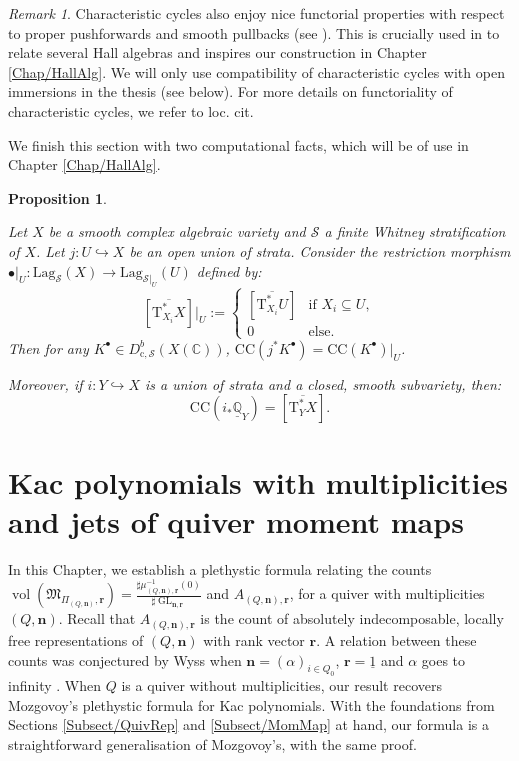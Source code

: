 \documentclass[11pt,english]{article}
\numberwithin{equation}{section}
\numberwithin{figure}{section}
\theoremstyle{definition}
\theoremstyle{plain}
\newtheorem{prop}[df]{Proposition}
\theoremstyle{remark}
\newtheorem{rmk}[df]{Remark}
\DeclareMathOperator{\GL}{GL}
\DeclareMathOperator{\vol}{vol}
\newcommand\nn{\mathbf{n}}
\newcommand\rr{\mathbf{r}}
\newcommand\QQ{\mathbb{Q}}
\newcommand\CC{\mathbb{C}}
\begin{document}
\begin{rmk}

Characteristic cycles also enjoy nice functorial properties with respect
to proper pushforwards and smooth pullbacks (see \cite[Ch. IX.]{KS90}\cite{SV96}).
This is crucially used in \cite{Hen24} to relate several Hall algebras
and inspires our construction in Chapter \ref{Chap/HallAlg}. We will
only use compatibility of characteristic cycles with open immersions
in the thesis (see below). For more details on functoriality of characteristic
cycles, we refer to loc. cit.

\end{rmk}

We finish this section with two computational facts, which will be
of use in Chapter \ref{Chap/HallAlg}.

\begin{prop}{\cite[Prop. 9.4.3.]{KS90} \cite[Eqn. (9.4.8)]{KS90}}
\label{Prop/CCcomp}

Let $X$ be a smooth complex algebraic variety and $\mathcal{S}$
a finite Whitney stratification of $X$. Let $j:U\hookrightarrow X$
be an open union of strata. Consider the restriction morphism $\bullet\vert_{U}:\mathrm{Lag}_{\mathcal{S}}(X)\rightarrow\mathrm{Lag}_{\mathcal{S}\vert_{U}}(U)$
defined by:\[
[\overline{\mathrm{T}_{X_{i}}^{*}X}]\vert_{U}:=
\left\{
\begin{array}{ll}
[\overline{\mathrm{T}_{X_{i}}^{*}U}] & \text{if } X_i\subseteq U, \\
0 & \text{else.}
\end{array}
\right.
\] Then for any $K^{\bullet}\in D_{\mathrm{c},\mathcal{S}}^{b}(X(\CC))$,
$\mathrm{CC}(j^{*}K^{\bullet})=\mathrm{CC}(K^{\bullet})\vert_{U}$.

Moreover, if $i:Y\hookrightarrow X$ is a union of strata and a closed,
smooth subvariety, then:\[
\mathrm{CC}(i_*\underline{\QQ}_Y)=[\overline{\mathrm{T}_{Y}^{*}X}].
\]

\end{prop}

\pagebreak{}

\section{Kac polynomials with multiplicities and jets of quiver moment maps
\label{Chap/KacPolynomials}}

In this Chapter, we establish a plethystic formula relating the counts
$\vol(\mathfrak{M}_{\Pi_{(Q,\nn)},\rr})=\frac{\sharp\mu_{(Q,\nn),\rr}^{-1}(0)}{\sharp\GL_{\nn,\rr}}$
and $A_{(Q,\nn),\rr}$, for a quiver with multiplicities $(Q,\nn)$.
Recall that $A_{(Q,\nn),\rr}$ is the count of absolutely indecomposable,
locally free representations of $(Q,\nn)$ with rank vector $\rr$.
A relation between these counts was conjectured by Wyss when $\nn=(\alpha)_{i\in Q_{0}}$,
$\rr=\underline{1}$ and $\alpha$ goes to infinity \cite[Conj. 4.37.]{Wys17b}.
When $Q$ is a quiver without multiplicities, our result recovers
Mozgovoy's plethystic formula \cite{Moz11a} for Kac polynomials.
With the foundations from Sections \ref{Subsect/QuivRep} and \ref{Subsect/MomMap}
at hand, our formula is a straightforward generalisation of Mozgovoy's,
with the same proof.
\end{document}
